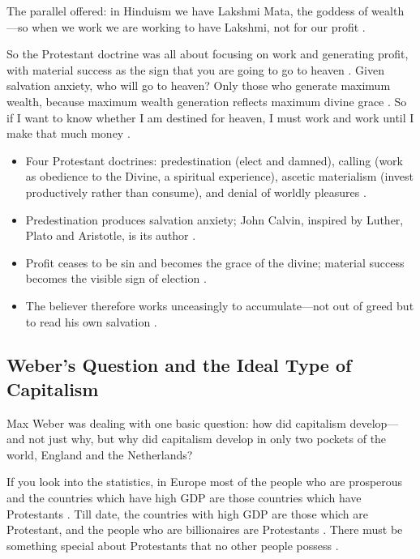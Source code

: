 The parallel offered: in Hinduism we have Lakshmi Mata, the goddess of wealth---so when we work we are working to have Lakshmi, not for our profit .

So the Protestant doctrine was all about focusing on work and generating profit, with material success as the sign that you are going to go to heaven .
Given salvation anxiety, who will go to heaven? Only those who generate maximum wealth, because maximum wealth generation reflects maximum divine grace . So if I want to know whether I am destined for heaven, I must work and work until I make that much money .

\begin{QuickRevision}
\begin{itemize}
    \item Four Protestant doctrines: predestination (elect and damned), calling (work as obedience to the Divine, a spiritual experience), ascetic materialism (invest productively rather than consume), and denial of worldly pleasures .
    \item Predestination produces salvation anxiety; John Calvin, inspired by Luther, Plato and Aristotle, is its author .
    \item Profit ceases to be sin and becomes the grace of the divine; material success becomes the visible sign of election .
    \item The believer therefore works unceasingly to accumulate---not out of greed but to read his own salvation .
\end{itemize}
\end{QuickRevision}

\subsection{Weber's Question and the Ideal Type of Capitalism}
Max Weber was dealing with one basic question: how did capitalism develop---and not just why, but why did capitalism develop in only two pockets of the world, England and the Netherlands? 

\begin{DataFact}
If you look into the statistics, in Europe most of the people who are prosperous and the countries which have high GDP are those countries which have Protestants .
Till date, the countries with high GDP are those which are Protestant, and the people who are billionaires are Protestants .
There must be something special about Protestants that no other people possess .
\end{DataFact}

